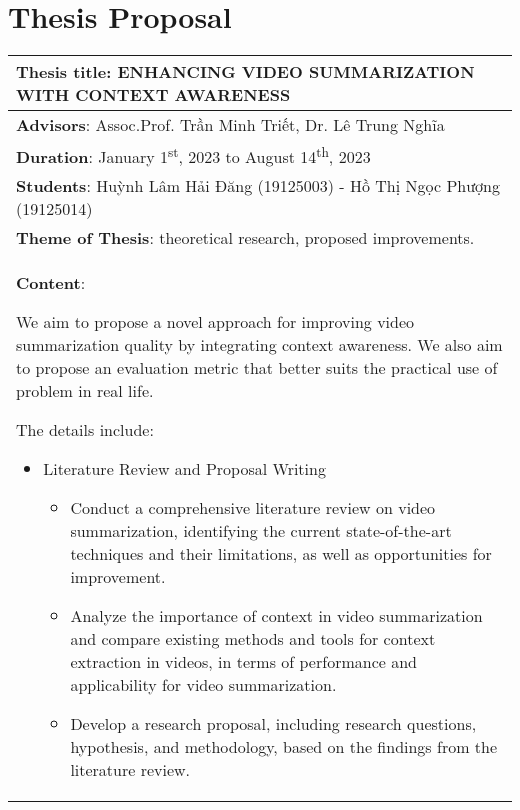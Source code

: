 \chapter{Thesis Proposal}
\begin{longtable}{|l|c|}
\hline
\multicolumn{2}{|m{\linewidth}|}{\textbf{Thesis title}: ENHANCING VIDEO SUMMARIZATION WITH CONTEXT AWARENESS
}\\
\hline
\multicolumn{2}{|m{\linewidth}|}{\textbf{Advisors}: Assoc.Prof. Trần Minh Triết, Dr. Lê Trung Nghĩa} \\
\hline
\multicolumn{2}{|m{\linewidth}|}{\textbf{Duration}: January 1\textsuperscript{st}, 2023 to August 14\textsuperscript{th}, 2023}\\
\hline
\multicolumn{2}{|m{\linewidth}|}{\textbf{Students}: Huỳnh Lâm Hải Đăng (19125003) - Hồ Thị Ngọc Phượng (19125014)}\\
\hline
\multicolumn{2}{|m{\linewidth}|}{\textbf{Theme of Thesis}: theoretical research, proposed improvements.}\\
\hline
\multicolumn{2}{|m{\linewidth}|}{\textbf{Content}:\par
We aim to propose a novel approach for improving video summarization quality by integrating context awareness. We also aim to propose an evaluation metric that better suits the practical use of problem in real life.\par
The details include:
\begin{itemize}
  \item Literature Review and Proposal Writing \begin{itemize}
    \item Conduct a comprehensive literature review on video summarization, identifying the current state-of-the-art techniques and their limitations, as well as opportunities for improvement. 
    \item Analyze the importance of context in video summarization and compare existing methods and tools for context extraction in videos, in terms of performance and applicability for video summarization.
    \item Develop a research proposal, including research questions, hypothesis, and methodology, based on the findings from the literature review.
  \end{itemize}
\end{itemize}}\\
\hline


\end{longtable}
